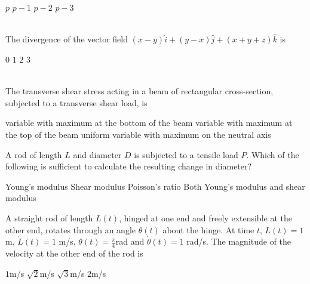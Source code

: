 \documentclass[addpoints,11pt]{exam}
\begin{document}
\begin{questions}
    \begin{oneparchoices}
        \choice $p$
        \choice $p-1$
        \choice $p-2$
        \choice $p-3$
    \end{oneparchoices}\\

    \question The divergence of the vector field $(x-y)\hat{i} + (y-x)\hat{j} + (x+y+z)\hat{k}$ is\\

    \begin{oneparchoices}
        \choice $0$
        \choice $1$
        \choice $2$
        \choice $3$
    \end{oneparchoices}\\

    \question The transverse shear stress acting in a beam of rectangular cross-section, subjected to a transverse shear load, is\\

    \begin{choices}
        \choice variable with maximum at the bottom of the beam
        \choice variable with maximum at the top of the beam
        \choice uniform
        \choice variable with maximum on the neutral axis
    \end{choices}
\pagebreak

    \question A rod of length $L$ and diameter $D$ is subjected to a tensile load $P$. Which of the following is sufficient to calculate the resulting change in diameter?\\

    \begin{choices}
        \choice Young's modulus
        \choice Shear modulus
        \choice Poisson's ratio
        \choice Both Young's modulus and shear modulus
    \end{choices}

    \question A straight rod of length $L(t)$, hinged at one end and freely extensible at the other end, rotates through an angle $\theta(t)$ about the hinge. At time $t$, $L(t)=1$ m, $\dot{L}(t)=1$ m/s, $\theta(t)=\frac{\pi}{4}$rad and $\dot{\theta}(t)=1$ rad/s. The magnitude of the velocity at the other end of the rod is\\

    \begin{oneparchoices}
        \choice $1$m/s
        \choice $\sqrt{2}$m/s
        \choice $\sqrt{3}$m/s
        \choice $2$m/s
    \end{oneparchoices}\\


\end{questions}
\end{document}
